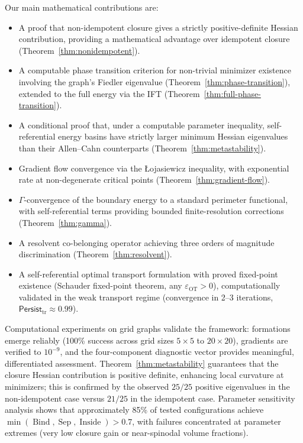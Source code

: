 \documentclass[lettersize,journal]{IEEEtran}
\DeclareMathOperator{\Bind}{Bind}
\DeclareMathOperator{\Sep}{Sep}
\DeclareMathOperator{\Inside}{Inside}
\begin{document}
Our main mathematical contributions are:
\begin{itemize}
\item A proof that non-idempotent closure gives a strictly positive-definite Hessian contribution, providing a mathematical advantage over idempotent closure (Theorem~\ref{thm:nonidempotent}).
\item A computable phase transition criterion for non-trivial minimizer existence involving the graph's Fiedler eigenvalue (Theorem~\ref{thm:phase-transition}), extended to the full energy via the IFT (Theorem~\ref{thm:full-phase-transition}).
\item A conditional proof that, under a computable parameter inequality, self-referential energy basins have strictly larger minimum Hessian eigenvalues than their Allen--Cahn counterparts (Theorem~\ref{thm:metastability}).
\item Gradient flow convergence via the \L{}ojasiewicz inequality, with exponential rate at non-degenerate critical points (Theorem~\ref{thm:gradient-flow}).
\item $\Gamma$-convergence of the boundary energy to a standard perimeter functional, with self-referential terms providing bounded finite-resolution corrections (Theorem~\ref{thm:gamma}).
\item A resolvent co-belonging operator achieving three orders of magnitude discrimination (Theorem~\ref{thm:resolvent}).
\item A self-referential optimal transport formulation with proved fixed-point existence (Schauder fixed-point theorem, any $\varepsilon_{\mathrm{OT}} > 0$), computationally validated in the weak transport regime (convergence in 2--3 iterations, $\mathsf{Persist}_{\mathrm{tr}} \approx 0.99$).
\end{itemize}

Computational experiments on grid graphs validate the framework: formations emerge reliably (100\% success across grid sizes $5 \times 5$ to $20 \times 20$), gradients are verified to $10^{-9}$, and the four-component diagnostic vector provides meaningful, differentiated assessment. Theorem~\ref{thm:metastability} guarantees that the closure Hessian contribution is positive definite, enhancing local curvature at minimizers; this is confirmed by the observed $25/25$ positive eigenvalues in the non-idempotent case versus $21/25$ in the idempotent case. Parameter sensitivity analysis shows that approximately 85\% of tested configurations achieve $\min(\Bind, \Sep, \Inside) > 0.7$, with failures concentrated at parameter extremes (very low closure gain or near-spinodal volume fractions).
\end{document}
